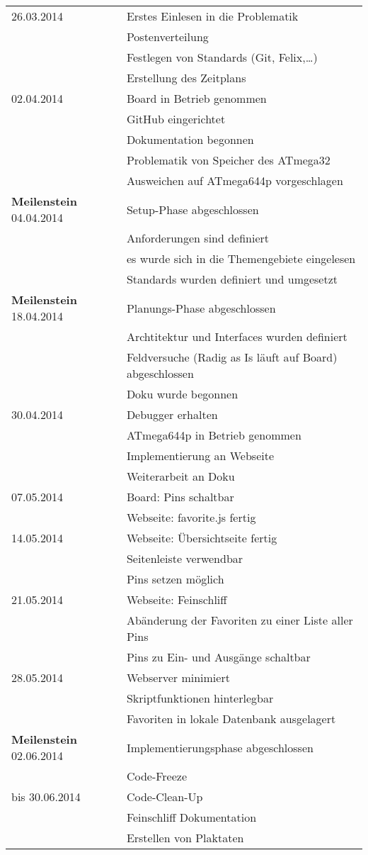 \begin{longtable}{ll}
26.03.2014 & Erstes Einlesen in die Problematik \\
& Postenverteilung\\
& Festlegen von Standards (Git, Felix,\ldots) \\
& Erstellung des Zeitplans \\
02.04.2014 & Board in Betrieb genommen\\
& GitHub eingerichtet\\ 
&Dokumentation begonnen\\ 
& Problematik von Speicher des ATmega32\\
& Ausweichen auf ATmega644p vorgeschlagen \\
\textbf{Meilenstein} 04.04.2014 & Setup-Phase abgeschlossen \\
& Anforderungen sind definiert\\
& es wurde sich in die 
Themengebiete eingelesen\\
& Standards wurden definiert und umgesetzt\\
\textbf{Meilenstein} 18.04.2014 & Planungs-Phase abgeschlossen \\
& Archtitektur und Interfaces wurden definiert\\
& Feldversuche (Radig as Is läuft auf Board) abgeschlossen \\
& Doku wurde begonnen\\
30.04.2014 & Debugger erhalten\\
& ATmega644p in Betrieb genommen\\
& Implementierung an Webseite\\
& Weiterarbeit an Doku \\
07.05.2014 & Board: Pins schaltbar \\
& Webseite: favorite.js fertig \\
14.05.2014 & Webseite: Übersichtseite fertig\\
& Seitenleiste verwendbar\\
& Pins setzen möglich\\
21.05.2014 & Webseite: Feinschliff\\ 
&Abänderung der Favoriten zu einer Liste aller Pins\\
& Pins zu Ein- und Ausgänge schaltbar \\
28.05.2014 & Webserver minimiert\\
& Skriptfunktionen hinterlegbar\\
& Favoriten in lokale Datenbank ausgelagert \\
\textbf{Meilenstein} 02.06.2014 & Implementierungsphase abgeschlossen \\
& Code-Freeze\\
bis 30.06.2014 & Code-Clean-Up\\
& Feinschliff Dokumentation\\
& Erstellen von Plaktaten\\
\end{longtable}



